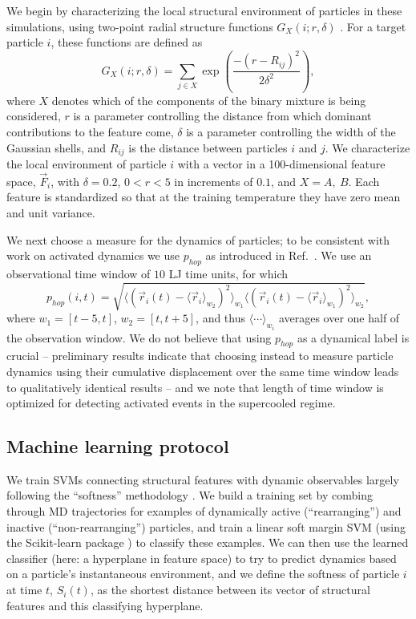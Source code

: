 \documentclass[aps,reprint,superscriptaddress,nofootinbib, notitlepage,prl]{revtex4-2}
\begin{document}
We begin by characterizing the local structural environment of particles in these simulations, using two-point radial structure functions $G_X(i;r,\delta)$ \cite{behler2007generalized}. For a target particle $i$, these functions are defined as
\begin{equation} 
G_X (i;r,\delta) = \sum_{j \in X} \exp\left( \frac{-(r - R_{ij})^2}{2\delta^2}\right),
\end{equation}
where $X$ denotes which of the components of the binary mixture is being considered, $r$ is a parameter controlling the distance from which dominant contributions to the feature come, $\delta$ is a parameter controlling the width of the Gaussian shells, and $R_{ij}$ is the distance between particles $i$ and $j$. We characterize the local environment of particle $i$ with a vector in a 100-dimensional feature space, $\vec{F}_i$, with $\delta=0.2$, $0<r<5$ in increments of $0.1$, and $X=A,\ B$. Each feature is standardized \cite{hsu2003practical} so that at the training temperature they have zero mean and unit variance.

We next choose a  measure for the dynamics of particles; to be consistent with work on activated dynamics we use $p_{hop}$ as introduced in Ref.~\cite{candelier2009building}. We use an observational time window of $10$ LJ time units, for which
\begin{equation*}
p_{hop}(i,t) = \sqrt{\langle (\vec{r}_i(t) - \langle \vec{r}_i \rangle_{w_2})^2\rangle_{w_1} \langle (\vec{r}_i(t) - \langle \vec{r}_i \rangle_{w_1})^2\rangle_{w_2}},
\end{equation*}
where ${w_1} = [t-5, t]$, ${w_2} = [t,t+5]$, and thus $\langle \cdots \rangle_{w_i}$  averages over one half of the observation window. We do not believe that using $p_{hop}$ as a dynamical label is crucial -- preliminary results indicate that choosing instead to measure particle dynamics using their cumulative displacement over the same time window leads to qualitatively identical results -- and we note that length of time window is optimized for detecting activated events in the supercooled regime. 

\subsection{Machine learning protocol}

We train SVMs connecting structural features with dynamic observables largely following the ``softness'' methodology \cite{schoenholz2016structural}. We build a training set by combing through MD trajectories for examples of dynamically active (``rearranging'') and inactive (``non-rearranging'') particles, and train a linear soft margin SVM (using the Scikit-learn package \cite{pedregosa2011scikit}) to classify these examples. We can then use the learned classifier (here: a hyperplane in feature space) to try to predict dynamics based on a particle's instantaneous environment, and we define the softness of particle $i$ at time $t$, $S_i(t)$, as the shortest distance between its vector of structural features and this classifying hyperplane.
\end{document}
